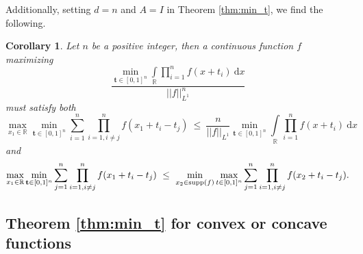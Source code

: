 \documentclass[11pt,reqno]{amsart}
\numberwithin{equation}{section}
\theoremstyle{plain}
\newtheorem{corollary}[thm]{Corollary}
\newcommand\be{\begin{equation}}
\newcommand\ee{\end{equation}}
\newcommand{\R}{\ensuremath{\mathbb{R}}}
\begin{document}
Additionally, setting $d=n$ and $A=I$ in Theorem \ref{thm:min_t}, we find the following.



\begin{corollary}\label{cor:many_t}
Let $n$ be a positive integer, then a continuous function $f$ maximizing
\begin{equation}
    \frac{\min\limits_{\mathbf{t}\in[0,1]^n}\displaystyle\int\limits_{\R}\prod\limits_{i=1}^{n}f(x+t_i)\ \mathrm{d}x}{||f||_{L^1}^{n}}
\end{equation}
must satisfy both
\begin{equation}
    \max\limits_{x_1 \in \R}\min\limits_{\mathbf{t}\in[0,1]^n}\sum\limits_{i=1}^{n}\prod\limits_{i=1,i\neq j}^{n}f(x_1+t_i-t_j)\ \le \ \frac{n}{||f||_{L^1}}\min\limits_{\mathbf{t}\in[0,1]^n}\int\limits_{\R}\prod\limits_{i=1}^{n}f(x+t_i)\ \mathrm{d}x
\end{equation}
and
\begin{equation}
    \max\limits_{x_1 \in \R}\min\limits_{\mathbf{t}\in[0,1]^n}\sum\limits_{j=1}^n \prod\limits_{i=1,i\neq j}^{n}f(x_1+t_i-t_j)\ \le \ \min\limits_{x_2 \in {\rm supp}(f)}\max\limits_{t\in[0,1]^n}\sum\limits_{j=1}^n \prod\limits_{i=1,i\neq j}^{n}f(x_2+t_i-t_j).
\end{equation}
\end{corollary}

\subsection{Theorem \ref{thm:min_t} for convex or concave functions}
\end{document}
